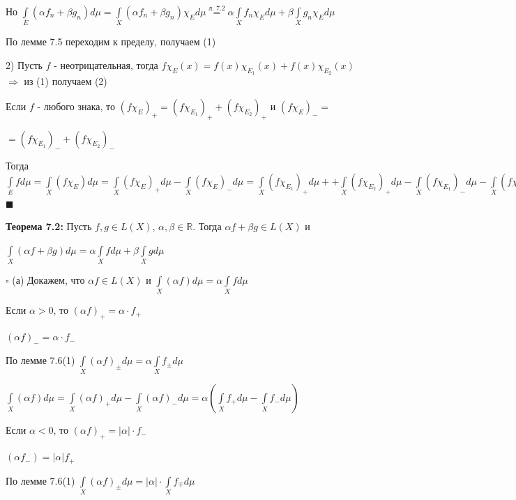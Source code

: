 \documentclass[a4paper]{report}
\begin{document}
Но $\displaystyle\int\limits_E(\alpha f_n+\beta g_n)d\mu=\displaystyle\int\limits_X(\alpha f_n+\beta g_n)\chi_Ed\mu\stackrel{\text{л. }7.2}{=}\alpha\displaystyle\int\limits_X f_n\chi_Ed\mu+\beta
\displaystyle\int\limits_X g_n\chi_E d\mu$

По лемме 7.5 переходим к пределу, получаем (1)

2) Пусть $f$ - неотрицательная, тогда $f\chi_E(x)=f(x)\chi_{E_1}(x)+f(x)\chi_{E_2}(x)$ $\Rightarrow$ из (1) получаем (2)

Если $f$ - любого знака, то $(f\chi_E)_+=(f\chi_{E_1})_++(f\chi_{E_2})_+$ и $(f\chi_E)_-=$

\noindent $=(f\chi_{E_1})_-+(f\chi_{E_2})_-$

Тогда $\displaystyle\int\limits_E fd\mu=\displaystyle\int\limits_X(f\chi_E)d\mu=\displaystyle\int\limits_X(f\chi_E)_+d\mu-\displaystyle\int\limits_X(f\chi_E)_-d\mu=\displaystyle\int\limits_X(f\chi_{E_1})_+d\mu++\displaystyle\int\limits_X
(f\chi_{E_2})_+d\mu-\displaystyle\int\limits_X(f\chi_{E_1})_-d\mu-\displaystyle\int\limits_X(f\chi_{E_2})_-d\mu=\displaystyle\int\limits_{E_1}fd\mu+\displaystyle\int\limits_{E_2}fd\mu$ $\blacksquare$
\bigskip

\noindent\textbf{Теорема 7.2:} Пусть $f,g\in L(X)$, $\alpha,\beta\in\mathbb R$. Тогда $\alpha f+\beta g\in L(X)$ и 

\noindent $\displaystyle\int\limits_X(\alpha f+\beta g)d\mu=\alpha\displaystyle\int\limits_Xfd\mu+\beta\displaystyle\int\limits_X gd\mu$

\noindent $\square$ (а) Докажем, что $\alpha f\in L(X)$ и $\displaystyle\int\limits_X(\alpha f)d\mu=\alpha\displaystyle\int\limits_X fd\mu$

Если $\alpha>0$, то $(\alpha f)_+=\alpha\cdot f_+$

$(\alpha f)_-=\alpha\cdot f_-$

По лемме 7.6(1) $\displaystyle\int\limits_X(\alpha f)_\pm d\mu=\alpha\displaystyle\int\limits_Xf_\pm d\mu$

$\displaystyle\int\limits_X (\alpha f)d\mu=\displaystyle\int\limits_X(\alpha f)_+d\mu-\displaystyle\int\limits_X(\alpha f)_-d\mu=\alpha(\displaystyle\int\limits_Xf_+d\mu-\displaystyle\int\limits_Xf_-d\mu)$

Если $\alpha<0$, то $(\alpha f)_+=|\alpha|\cdot f_-$

$(\alpha f_-)=|\alpha|f_+$

По лемме 7.6(1) $\displaystyle\int\limits_X(\alpha f)_\pm d\mu=|\alpha|\cdot\displaystyle\int\limits_X f_\mp d\mu$
\end{document}
